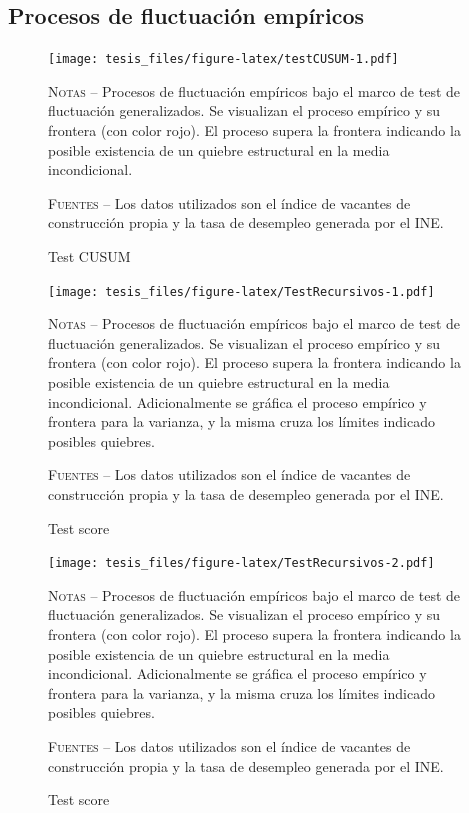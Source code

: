 \documentclass[12pt,oneside]{reedthesis}
\begin{document}
\hypertarget{efpAnexo}{%
\subsection{Procesos de fluctuación empíricos}\label{efpAnexo}}
\begin{figure}
\texttt{[image: tesis\_files/figure-latex/testCUSUM-1.pdf]}
\caption{Test CUSUM}\label{fig:testCUSUM}\textsc{}

\footnotesize\textsc{Notas} -- Procesos de fluctuación empíricos bajo el marco de test de fluctuación generalizados. Se visualizan el proceso empírico y su frontera (con color rojo). El proceso supera la frontera indicando la posible existencia de un quiebre estructural en la media incondicional.

\textsc{Fuentes} -- Los datos utilizados son el índice de vacantes de construcción propia y la tasa de desempleo generada por el INE.
\end{figure}
\begin{figure}
\texttt{[image: tesis\_files/figure-latex/TestRecursivos-1.pdf]}
\caption{Test score}\label{fig:TestRecursivos}\textsc{}

\footnotesize\textsc{Notas} -- Procesos de fluctuación empíricos bajo el marco de test de fluctuación generalizados. Se visualizan el proceso empírico y su frontera (con color rojo). El proceso supera la frontera indicando la posible existencia de un quiebre estructural en la media incondicional. Adicionalmente se gráfica el proceso empírico y frontera para la varianza, y la misma cruza los límites indicado posibles quiebres.

\textsc{Fuentes} -- Los datos utilizados son el índice de vacantes de construcción propia y la tasa de desempleo generada por el INE.
\end{figure}
\begin{figure}
\texttt{[image: tesis\_files/figure-latex/TestRecursivos-2.pdf]}
\caption{Test score}\label{fig:TestRecursivos}\textsc{}

\footnotesize\textsc{Notas} -- Procesos de fluctuación empíricos bajo el marco de test de fluctuación generalizados. Se visualizan el proceso empírico y su frontera (con color rojo). El proceso supera la frontera indicando la posible existencia de un quiebre estructural en la media incondicional. Adicionalmente se gráfica el proceso empírico y frontera para la varianza, y la misma cruza los límites indicado posibles quiebres.

\textsc{Fuentes} -- Los datos utilizados son el índice de vacantes de construcción propia y la tasa de desempleo generada por el INE.
\end{figure}
\end{document}

